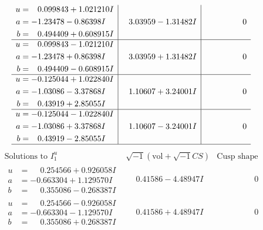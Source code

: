 \documentclass[1p]{elsarticle_modified}
\theoremstyle{definition}
\newcommand{\I}{\sqrt{-1}}
\begin{document}
$$\begin{array}{c|c|c}
\begin{aligned}
u &= \phantom{-}0.099843 + 1.021210 I \\
a &= -1.23478 - 0.86398 I \\
b &= \phantom{-}0.494409 + 0.608915 I\end{aligned}
 & \phantom{-}3.03959 - 1.31482 I & \phantom{-0.000000 } 0 \\ \hline\begin{aligned}
u &= \phantom{-}0.099843 - 1.021210 I \\
a &= -1.23478 + 0.86398 I \\
b &= \phantom{-}0.494409 - 0.608915 I\end{aligned}
 & \phantom{-}3.03959 + 1.31482 I & \phantom{-0.000000 } 0 \\ \hline\begin{aligned}
u &= -0.125044 + 1.022840 I \\
a &= -1.03086 - 3.37868 I \\
b &= \phantom{-}0.43919 + 2.85055 I\end{aligned}
 & \phantom{-}1.10607 + 3.24001 I & \phantom{-0.000000 } 0 \\ \hline\begin{aligned}
u &= -0.125044 - 1.022840 I \\
a &= -1.03086 + 3.37868 I \\
b &= \phantom{-}0.43919 - 2.85055 I\end{aligned}
 & \phantom{-}1.10607 - 3.24001 I & \phantom{-0.000000 } 0\\
 \hline 
 \end{array}$$\newpage$$\begin{array}{c|c|c}  
\text{Solutions to }I^u_{1}& \I (\text{vol} + \sqrt{-1}CS) & \text{Cusp shape}\\
 \hline 
\begin{aligned}
u &= \phantom{-}0.254566 + 0.926058 I \\
a &= -0.663304 + 1.129570 I \\
b &= \phantom{-}0.355086 - 0.268387 I\end{aligned}
 & \phantom{-}0.41586 - 4.48947 I & \phantom{-0.000000 } 0 \\ \hline\begin{aligned}
u &= \phantom{-}0.254566 - 0.926058 I \\
a &= -0.663304 - 1.129570 I \\
b &= \phantom{-}0.355086 + 0.268387 I\end{aligned}
 & \phantom{-}0.41586 + 4.48947 I & \phantom{-0.000000 } 0 \\ \hline\begin{aligned}

\end{aligned}
\end{array}$$
\end{document}
